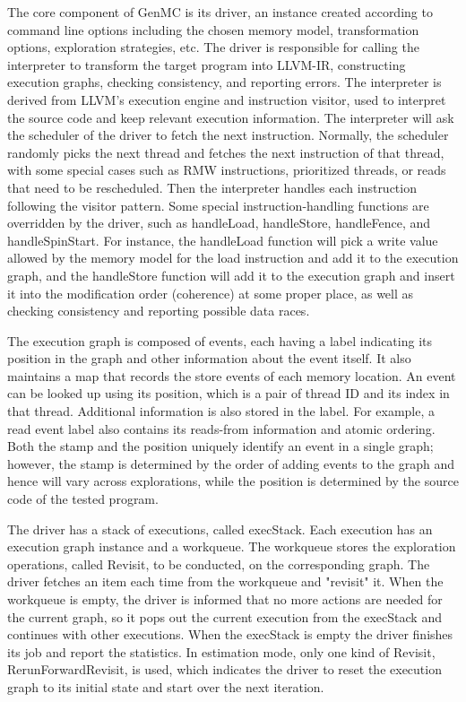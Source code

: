 The core component of GenMC is its driver, an instance created according to command line options including the chosen memory model, transformation options, exploration strategies, etc. The driver is responsible for calling the interpreter to transform the target program into LLVM-IR, constructing execution graphs, checking consistency, and reporting errors. The interpreter is derived from LLVM's execution engine and instruction visitor, used to interpret the source code and keep relevant execution information. The interpreter will ask the scheduler of the driver to fetch the next instruction. Normally, the scheduler randomly picks the next thread and fetches the next instruction of that thread, with some special cases such as RMW instructions, prioritized threads, or reads that need to be rescheduled. Then the interpreter handles each instruction following the visitor pattern. Some special instruction-handling functions are overridden by the driver, such as handleLoad, handleStore, handleFence, and handleSpinStart. For instance, the handleLoad function will pick a write value allowed by the memory model for the load instruction and add it to the execution graph, and the handleStore function will add it to the execution graph and insert it into the modification order (coherence) at some proper place, as well as checking consistency and reporting possible data races.


The execution graph is composed of events, each having a label indicating its position in the graph and other information about the event itself. It also maintains a map that records the store events of each memory location. An event can be looked up using its position, which is a pair of thread ID and its index in that thread. Additional information is also stored in the label. For example, a read event label also contains its reads-from information and atomic ordering. Both the stamp and the position uniquely identify an event in a single graph; however, the stamp is determined by the order of adding events to the graph and hence will vary across explorations, while the position is determined by the source code of the tested program.


The driver has a stack of executions, called execStack. Each execution has an execution graph instance and a workqueue. The workqueue stores the exploration operations, called Revisit, to be conducted, on the corresponding graph. The driver fetches an item each time from the workqueue and "revisit" it. When the workqueue is empty, the driver is informed that no more actions are needed for the current graph, so it pops out the current execution from the execStack and continues with other executions. When the execStack is empty the driver finishes its job and report the statistics. In estimation mode, only one kind of Revisit, RerunForwardRevisit, is used, which indicates the driver to reset the execution graph to its initial state and start over the next iteration.

